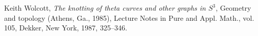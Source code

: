 \documentclass{amsart}
\numberwithin{equation}{section}
\theoremstyle{definition}
\begin{document}
\begin{thebibliography}{99}
	

	
	Keith Wolcott,
	\emph{The knotting of theta curves and other graphs in $S^3$},
	Geometry and topology (Athens, Ga., 1985),
	Lecture Notes in Pure and Appl. Math., vol. 105,
	Dekker, New York, 1987, 325--346.

\end{thebibliography}
\end{document}
